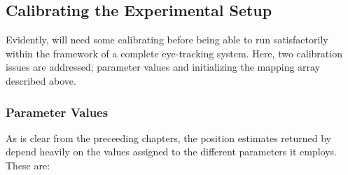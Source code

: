 \subsection{Calibrating the Experimental Setup}
\label{algo:future:calibrate}

Evidently, {\octopus} will need some calibrating before being able to
run satisfactorily within the framework of a complete eye-tracking
system.  Here, two calibration issues are addressed; parameter values
and initializing the mapping array described above.

\subsubsection{Parameter Values}

As is clear from the preceeding chapters, the position estimates
returned by {\octopus} depend heavily on the values assigned to the
different parameters it employs.  These are:

